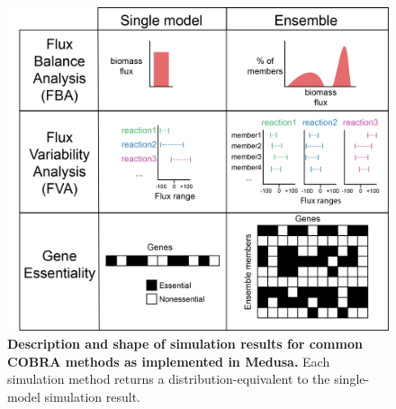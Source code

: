 \documentclass[11pt,twocolumn,notitlepage,openany,twoside]{book}
\begin{document}
\begin{refsection}
\begin{figure}[tb]
\centering
\includegraphics[width=\linewidth]{ch4_fig2}
\caption[ Description and shape of simulation results for common COBRA methods as implemented in Medusa.]{\textbf{ Description and shape of simulation results for common COBRA methods as implemented in Medusa.} Each simulation method returns a distribution-equivalent to the single-model simulation result.}
\end{figure}


\end{refsection}
\end{document}
